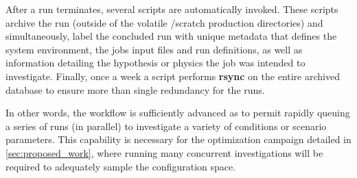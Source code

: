 After a run terminates, several scripts are automatically invoked. 
These scripts archive the run (outside of the volatile /scratch 
production directories) and simultaneously, label the concluded run with
unique metadata that defines the system environment, the jobs input
files and run definitions, as well as information detailing the
hypothesis or physics the job was intended to investigate. Finally, once
a week a script performs \textbf{rsync} on the entire archived database to
ensure more than single redundancy for the runs. 

In other words, the workflow is sufficiently advanced as to permit
rapidly queuing a series of runs (in parallel) to
investigate a variety of conditions or scenario parameters. This
capability is necessary for the optimization campaign detailed in
\ref{sec:proposed_work}, where running many concurrent investigations
will be required to adequately sample the configuration space. 
